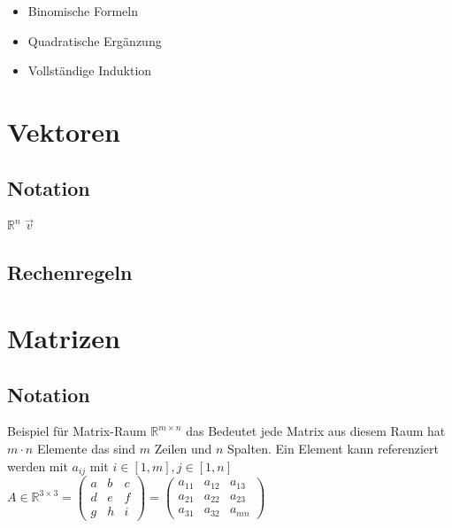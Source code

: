\documentclass[10pt,a4paper]{article}
\begin{document}

\begin{itemize}
\item Binomische Formeln
\item Quadratische Ergänzung
\item Vollständige Induktion
\end{itemize}




\section{Vektoren}

\subsection{Notation}
$\mathbb{R}^{n}$
$\vec{v}$

\subsection{Rechenregeln}
% 

\section{Matrizen}

\subsection{Notation}

Beispiel für Matrix-Raum $\mathbb{R}^{m\times n}$ das Bedeutet jede Matrix aus diesem Raum hat $m \cdot n $ Elemente das sind $m$ Zeilen und $n$ Spalten.
Ein Element kann referenziert werden mit $a_{ij}$ mit $i \in [1, m], j \in [1, n] $
\\

$A \in \mathbb{R}^{3\times 3} = \begin{pmatrix} a & b & c \\ d & e & f \\ g & h & i \end{pmatrix} 
   = \begin{pmatrix} a_{11} & a_{12} & a_{13} \\ a_{21} & a_{22} & a_{23} \\ a_{31} & a_{32} & a_{mn} \end{pmatrix} 
 $
\end{document}

